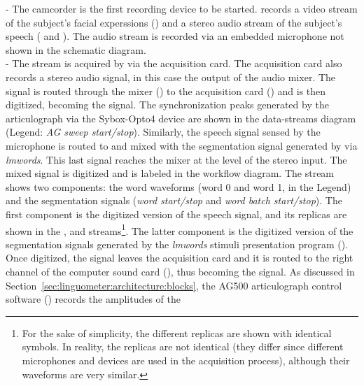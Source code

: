  - The  camcorder is the first recording device to be
started. 
 records a video stream of the subject's facial experssions
() and a stereo audio stream of the subject's speech 
( and ).
The audio stream is recorded via an embedded microphone not shown in the
schematic diagram.\\

 - The  stream is acquired by  via the
 acquisition
card.
The acquisition card also records a stereo audio signal, in this case the
output of the  audio mixer.
The  signal is routed through the mixer () to the 
acquisition card () and is then digitized, becoming the 
signal.
The synchronization peaks generated by the articulograph via the Sybox-Opto4
device are shown in the data-streams diagram
(Legend: \emph{AG sweep start/stop}).
Similarly, the speech signal  sensed by the  microphone is
routed to  and mixed with the segmentation signal generated 
by  via \emph{lmwords}.
This last signal reaches the  mixer at the level of the 
stereo input.
The mixed signal is digitized and is labeled  in the workflow
diagram.
The  stream shows two components: the word waveforms (word 0 and
word 1, in the Legend) and the segmentation signals (\emph{word start/stop} and 
\emph{word batch start/stop}).
The first component is the digitized version of the  speech signal,
and its replicas are shown in the ,  and 
streams\footnote{For the sake of simplicity, the different replicas are shown
with identical symbols. In reality, the replicas are not identical 
(they differ since different microphones and devices are used in the 
acquisition process), although their waveforms are very similar.}.
The latter component is the digitized version of the segmentation signals
generated by the \emph{lmwords} stimuli presentation program
().
Once digitized, the  signal leaves the  acquisition
card and it is routed to the right channel of the  computer sound card
(), thus becoming the  signal.
As discussed in Section~\ref{sec:linguometer:architecture:blocks}, the AG500
articulograph control software () records the amplitudes of the

